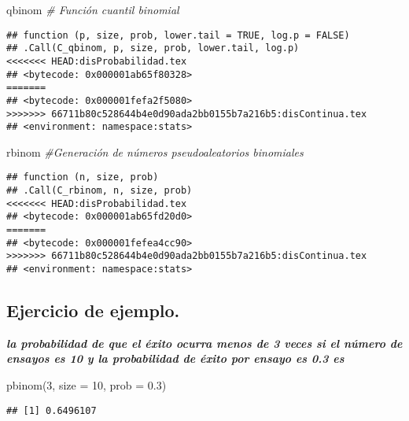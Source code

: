 \documentclass[
]{article}
\newenvironment{Shaded}{\begin{snugshade}}{\end{snugshade}}
\newcommand{\AttributeTok}[1]{\textcolor[rgb]{0.77,0.63,0.00}{#1}}
\newcommand{\CommentTok}[1]{\textcolor[rgb]{0.56,0.35,0.01}{\textit{#1}}}
\newcommand{\DecValTok}[1]{\textcolor[rgb]{0.00,0.00,0.81}{#1}}
\newcommand{\FloatTok}[1]{\textcolor[rgb]{0.00,0.00,0.81}{#1}}
\newcommand{\FunctionTok}[1]{\textcolor[rgb]{0.00,0.00,0.00}{#1}}
\newcommand{\NormalTok}[1]{#1}
\begin{document}
\begin{Shaded}
\begin{Highlighting}[]
\NormalTok{qbinom }\CommentTok{\#    Función cuantil binomial}
\end{Highlighting}
\end{Shaded}

\begin{verbatim}
## function (p, size, prob, lower.tail = TRUE, log.p = FALSE) 
## .Call(C_qbinom, p, size, prob, lower.tail, log.p)
<<<<<<< HEAD:disProbabilidad.tex
## <bytecode: 0x000001ab65f80328>
=======
## <bytecode: 0x000001fefa2f5080>
>>>>>>> 66711b80c528644b4e0d90ada2bb0155b7a216b5:disContinua.tex
## <environment: namespace:stats>
\end{verbatim}

\begin{Shaded}
\begin{Highlighting}[]
\NormalTok{rbinom  }\CommentTok{\#Generación de números pseudoaleatorios binomiales}
\end{Highlighting}
\end{Shaded}

\begin{verbatim}
## function (n, size, prob) 
## .Call(C_rbinom, n, size, prob)
<<<<<<< HEAD:disProbabilidad.tex
## <bytecode: 0x000001ab65fd20d0>
=======
## <bytecode: 0x000001fefea4cc90>
>>>>>>> 66711b80c528644b4e0d90ada2bb0155b7a216b5:disContinua.tex
## <environment: namespace:stats>
\end{verbatim}

\hypertarget{ejercicio-de-ejemplo.}{%
\subsection{Ejercicio de ejemplo.}\label{ejercicio-de-ejemplo.}}

\textbf{\emph{la probabilidad de que el éxito ocurra menos de 3 veces si
el número de ensayos es 10 y la probabilidad de éxito por ensayo es 0.3
es}}

\begin{Shaded}
\begin{Highlighting}[]
\FunctionTok{pbinom}\NormalTok{(}\DecValTok{3}\NormalTok{, }\AttributeTok{size =} \DecValTok{10}\NormalTok{, }\AttributeTok{prob =} \FloatTok{0.3}\NormalTok{)}
\end{Highlighting}
\end{Shaded}

\begin{verbatim}
## [1] 0.6496107
\end{verbatim}
\end{document}
